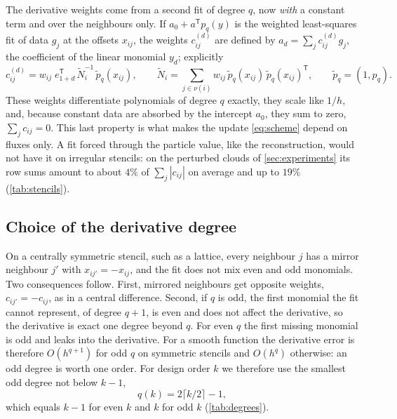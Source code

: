 \documentclass[11pt,a4paper]{article}
\numberwithin{equation}{section}
\newcommand{\nb}{\nu}
\newcommand{\ptil}{\tilde p}
\newcommand{\Ntil}{\tilde N}
\newcommand{\qdiv}{q}
\begin{document}
The derivative weights come from a second fit of degree $q$, now \emph{with} a constant term and over the neighbours only. If $a_0+a^{\mathsf T}p_q(y)$ is the weighted least-squares fit of data $g_j$ at the offsets $x_{ij}$, the weights $c^{(d)}_{ij}$ are defined by $a_d=\sum_jc^{(d)}_{ij}g_j$, the coefficient of the linear monomial $y_d$; explicitly
\begin{equation}\label{eq:cij}
c^{(d)}_{ij} = w_{ij}\; e_{1+d}^{\mathsf T}\,\Ntil_i^{-1}\,\ptil_q(x_{ij}),\qquad
\Ntil_i=\sum_{j\in\nb(i)} w_{ij}\,\ptil_q(x_{ij})\,\ptil_q(x_{ij})^{\mathsf T},\qquad \ptil_q=(1,p_q).
\end{equation}
These weights differentiate polynomials of degree $q$ exactly, they scale like $1/h$, and, because constant data are absorbed by the intercept $a_0$, they sum to zero, $\sum_jc_{ij}=0$. This last property is what makes the update \eqref{eq:scheme} depend on fluxes only. A fit forced through the particle value, like the reconstruction, would not have it on irregular stencils: on the perturbed clouds of \cref{sec:experiments} its row sums amount to about $4\%$ of $\sum_j|c_{ij}|$ on average and up to $19\%$ (\cref{tab:stencils}).

\subsection{Choice of the derivative degree}\label{sec:parity}

On a centrally symmetric stencil, such as a lattice, every neighbour $j$ has a mirror neighbour $j'$ with $x_{ij'}=-x_{ij}$, and the fit does not mix even and odd monomials. Two consequences follow. First, mirrored neighbours get opposite weights, $c_{ij'}=-c_{ij}$, as in a central difference. Second, if $q$ is odd, the first monomial the fit cannot represent, of degree $q+1$, is even and does not affect the derivative, so the derivative is exact one degree beyond $q$. For even $q$ the first missing monomial is odd and leaks into the derivative. For a smooth function the derivative error is therefore $O(h^{q+1})$ for odd $q$ on symmetric stencils and $O(h^q)$ otherwise: an odd degree is worth one order. For design order $k$ we therefore use the smallest odd degree not below $k-1$,
\begin{equation}\label{eq:qk}
\qdiv(k) = 2\lceil k/2\rceil - 1,
\end{equation}
which equals $k-1$ for even $k$ and $k$ for odd $k$ (\cref{tab:degrees}).
\end{document}
